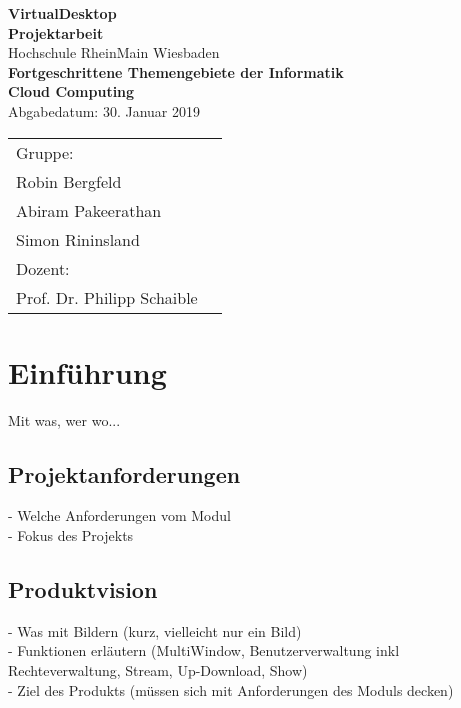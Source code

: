 \documentclass[a4paper, 10pt]{scrreprt}
\begin{document}
\begin{titlepage}
    \begin{center}
    \LARGE \textbf{VirtualDesktop} \\
    \vspace{2.5cm}
    \large\textbf{Projektarbeit}\\
    \vspace{2.5cm}
    \normalsize
    Hochschule RheinMain Wiesbaden \\
    \vspace{2cm}
    \large \textbf{Fortgeschrittene Themengebiete der Informatik\\ Cloud Computing\\}
    \vspace{1cm}
    \normalsize
    Abgabedatum: 30. Januar 2019\\
    \vspace{2.7cm}
    \end{center}
 \normalsize{
    \begin{tabular}{ll}
    	Gruppe: & \\
    	Robin Bergfeld & \\
    	Abiram Pakeerathan & \\
    	Simon Rininsland & \\[0.5cm]
    	Dozent: &\\
        Prof. Dr. Philipp Schaible & \\
    \end{tabular}
    }
\end{titlepage}



\clearpage
\tableofcontents
\clearpage



\chapter{Einführung}
Mit was, wer wo...

\section{Projektanforderungen}
- Welche Anforderungen vom Modul\\
- Fokus des Projekts

\section{Produktvision}
- Was mit Bildern (kurz, vielleicht nur ein Bild)\\
- Funktionen erläutern (MultiWindow, Benutzerverwaltung inkl Rechteverwaltung, Stream, Up-Download, Show)\\
- Ziel des Produkts (müssen sich mit Anforderungen des Moduls decken)\\
\end{document}
